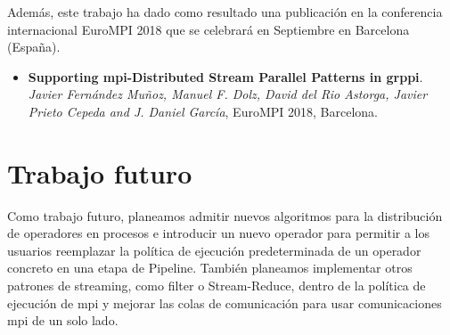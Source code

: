 Además, este trabajo ha dado como resultado una publicación en la conferencia internacional EuroMPI 2018 que se celebrará en Septiembre en Barcelona (España).

\begin{itemize}
\item \textbf{Supporting \acrshort{mpi}-Distributed Stream Parallel Patterns in \acrshort{grppi}}\cite{eurompi2018}. \textit{Javier Fernández Muñoz, Manuel F. Dolz, David del Rio Astorga, Javier Prieto Cepeda and J. Daniel García}, EuroMPI 2018, Barcelona.
\end{itemize}

\section{Trabajo futuro}
\label{sec:trabajo_futuro}

Como trabajo futuro, planeamos admitir nuevos algoritmos para la distribución de operadores en procesos e introducir un nuevo operador para permitir a los usuarios reemplazar la política de ejecución predeterminada de un operador concreto en una etapa de Pipeline. También planeamos implementar otros patrones de streaming, como filter o Stream-Reduce, dentro de la política de ejecución de \acrshort{mpi} y mejorar las colas de comunicación para usar comunicaciones \acrshort{mpi} de un solo lado.

\afterpage{\blankpage} %